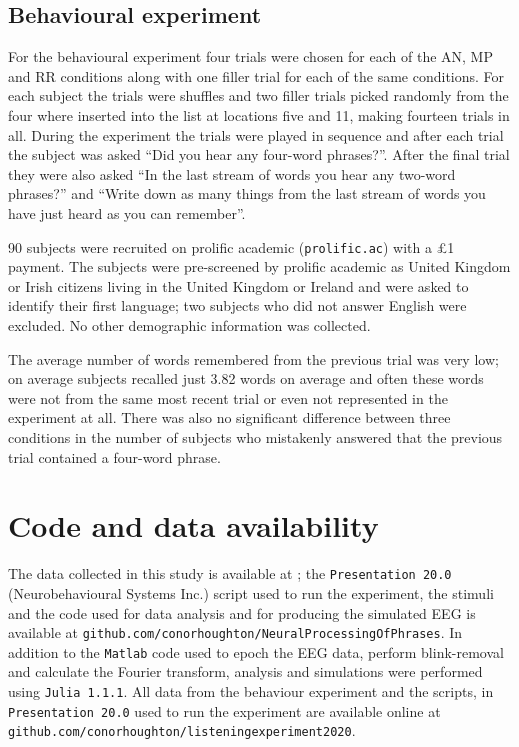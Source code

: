\documentclass[10pt,letterpaper]{article}
\begin{document}
\subsection*{Behavioural experiment}

For the behavioural experiment four trials were chosen for each of the
AN, MP and RR conditions along with one filler trial for each of the
same conditions. For each subject the trials were shuffles and two
filler trials picked randomly from the four where inserted into the
list at locations five and 11, making fourteen trials in all. During
the experiment the trials were played in sequence and after each trial
the subject was asked ``Did you hear any four-word phrases?''. After
the final trial they were also asked ``In the last stream of words you
hear any two-word phrases?'' and ``Write down as many things from the
last stream of words you have just heard as you can remember''.

90 subjects were recruited on prolific academic (\texttt{prolific.ac})
with a £1 payment. The subjects were pre-screened by prolific academic
as United Kingdom or Irish citizens living in the United Kingdom or
Ireland and were asked to identify their first language; two subjects
who did not answer English were excluded. No other demographic
information was collected.

The average number of words remembered from the previous trial was
very low; on average subjects recalled just 3.82 words on average and
often these words were not from the same most recent trial or even not
represented in the experiment at all. There was also no significant
difference between three conditions in the number of subjects who
mistakenly answered that the previous trial contained a four-word
phrase.

\section*{Code and data availability}
The data collected in this study is available at ; the
\texttt{Presentation 20.0} (Neurobehavioural Systems Inc.) script used
to run the experiment, the stimuli and the code used for data analysis
and for producing the simulated EEG is available at
\texttt{github.com/conorhoughton/NeuralProcessingOfPhrases}.  In
addition to the \texttt{Matlab} code used to epoch the EEG data,
perform blink-removal and calculate the Fourier transform, analysis
and simulations were performed using \texttt{Julia 1.1.1}. All data
from the behaviour experiment and the scripts, in \texttt{Presentation 20.0}
 used to run the experiment are
available online at \texttt{github.com/conorhoughton/listening\textunderscore{}experiment\textunderscore{}2020}.
\end{document}
